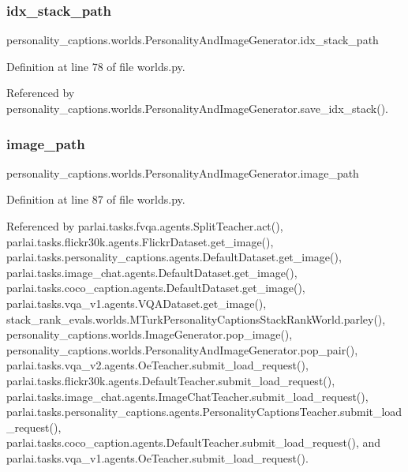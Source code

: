 \subsubsection{\texorpdfstring{idx\+\_\+stack\+\_\+path}{idx\_stack\_path}}
{\footnotesize\ttfamily personality\+\_\+captions.\+worlds.\+Personality\+And\+Image\+Generator.\+idx\+\_\+stack\+\_\+path}



Definition at line 78 of file worlds.\+py.



Referenced by personality\+\_\+captions.\+worlds.\+Personality\+And\+Image\+Generator.\+save\+\_\+idx\+\_\+stack().

\mbox{\label{classpersonality__captions_1_1worlds_1_1PersonalityAndImageGenerator_a452cf9ea9acd062f28f5136bed609bb0}} 
\subsubsection{\texorpdfstring{image\+\_\+path}{image\_path}}
{\footnotesize\ttfamily personality\+\_\+captions.\+worlds.\+Personality\+And\+Image\+Generator.\+image\+\_\+path}



Definition at line 87 of file worlds.\+py.



Referenced by parlai.\+tasks.\+fvqa.\+agents.\+Split\+Teacher.\+act(), parlai.\+tasks.\+flickr30k.\+agents.\+Flickr\+Dataset.\+get\+\_\+image(), parlai.\+tasks.\+personality\+\_\+captions.\+agents.\+Default\+Dataset.\+get\+\_\+image(), parlai.\+tasks.\+image\+\_\+chat.\+agents.\+Default\+Dataset.\+get\+\_\+image(), parlai.\+tasks.\+coco\+\_\+caption.\+agents.\+Default\+Dataset.\+get\+\_\+image(), parlai.\+tasks.\+vqa\+\_\+v1.\+agents.\+V\+Q\+A\+Dataset.\+get\+\_\+image(), stack\+\_\+rank\+\_\+evals.\+worlds.\+M\+Turk\+Personality\+Captions\+Stack\+Rank\+World.\+parley(), personality\+\_\+captions.\+worlds.\+Image\+Generator.\+pop\+\_\+image(), personality\+\_\+captions.\+worlds.\+Personality\+And\+Image\+Generator.\+pop\+\_\+pair(), parlai.\+tasks.\+vqa\+\_\+v2.\+agents.\+Oe\+Teacher.\+submit\+\_\+load\+\_\+request(), parlai.\+tasks.\+flickr30k.\+agents.\+Default\+Teacher.\+submit\+\_\+load\+\_\+request(), parlai.\+tasks.\+image\+\_\+chat.\+agents.\+Image\+Chat\+Teacher.\+submit\+\_\+load\+\_\+request(), parlai.\+tasks.\+personality\+\_\+captions.\+agents.\+Personality\+Captions\+Teacher.\+submit\+\_\+load\+\_\+request(), parlai.\+tasks.\+coco\+\_\+caption.\+agents.\+Default\+Teacher.\+submit\+\_\+load\+\_\+request(), and parlai.\+tasks.\+vqa\+\_\+v1.\+agents.\+Oe\+Teacher.\+submit\+\_\+load\+\_\+request().

